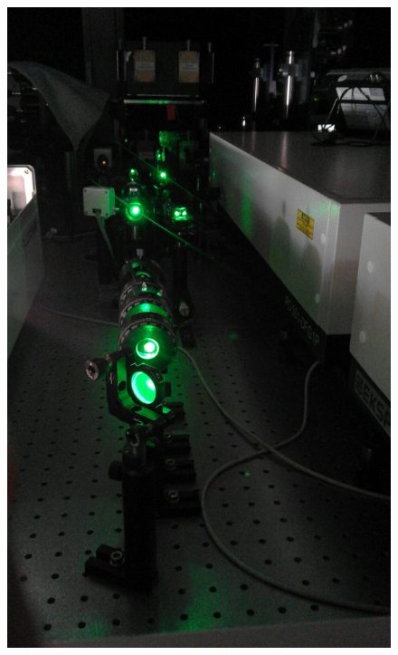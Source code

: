 \documentclass{beamer}
\begin{document}
\begin{frame}
\begin{columns}
\begin{figure}
\includegraphics[height=0.7\textheight]{image-conny}
\end{figure}
\end{columns}
\end{frame}
\end{document}
